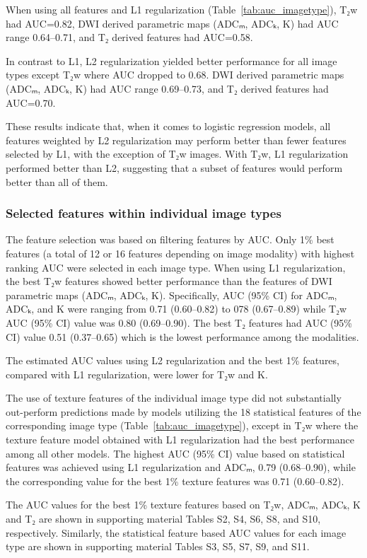 When using all features and L1 regularization (Table~\ref{tab:auc_imagetype}),
T₂w had AUC=0.82, DWI derived parametric maps (ADCₘ, ADCₖ, K) had AUC range
0.64--0.71, and T₂ derived features had AUC=0.58.

In contrast to L1, L2 regularization yielded better performance for all image
types except T₂w where AUC dropped to 0.68. DWI derived parametric maps (ADCₘ,
ADCₖ, K) had AUC range 0.69--0.73, and T₂ derived features had AUC=0.70.

These results indicate that, when it comes to logistic regression models, all
features weighted by L2 regularization may perform better than fewer features
selected by L1, with the exception of T₂w images. With T₂w, L1 regularization
performed better than L2, suggesting that a subset of features would perform
better than all of them.


\subsubsection{Selected features within individual image types}

The feature selection was based on filtering features by AUC\@. Only 1\% best
features (a total of 12 or 16 features depending on image modality) with highest
ranking AUC were selected in each image type. When using L1 regularization, the
best T₂w features showed better performance than the features of DWI
parametric maps (ADCₘ, ADCₖ, K). Specifically, AUC (95\% CI) for ADCₘ, ADCₖ,
and K were ranging from 0.71 (0.60--0.82) to 078 (0.67--0.89) while T₂w AUC
(95\% CI) value was 0.80 (0.69--0.90). The best T₂ features had AUC (95\% CI)
value 0.51 (0.37--0.65) which is the lowest performance among the modalities.

The estimated AUC values using L2 regularization and the best 1\% features,
compared with L1 regularization, were lower for T₂w and K.

The use of texture features of the individual image type did not substantially
out-perform predictions made by models utilizing the 18 statistical features of
the corresponding image type (Table~\ref{tab:auc_imagetype}), except in T₂w
where the texture feature model obtained with L1 regularization had the best
performance among all other models. The highest AUC (95\% CI) value based on
statistical features was achieved using L1 regularization and ADCₘ, 0.79
(0.68--0.90), while the corresponding value for the best 1\% texture features
was 0.71 (0.60--0.82).

The AUC values for the best 1\% texture features based on T₂w, ADCₘ, ADCₖ, K
and T₂ are shown in supporting material Tables S2, S4, S6, S8, and S10,
respectively. Similarly, the statistical feature based AUC values for each image
type are shown in supporting material Tables S3, S5, S7, S9, and S11.


